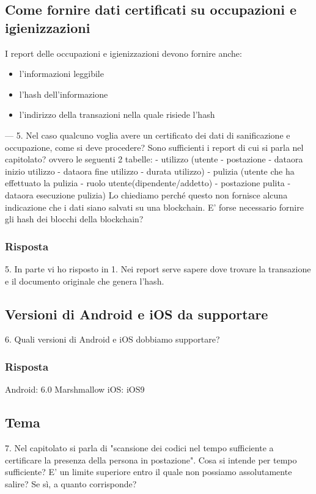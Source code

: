 \subsection*{Come fornire dati certificati su occupazioni e igienizzazioni}
I report delle occupazioni e igienizzazioni devono fornire anche:
\begin{itemize}
	\item l'informazioni leggibile
	\item l'hash dell'informazione
	\item l'indirizzo della transazioni nella quale risiede l'hash
\end{itemize}
---
5. Nel caso qualcuno voglia avere un certificato dei dati di sanificazione e occupazione, come si deve procedere? Sono sufficienti i report di cui si parla nel capitolato? ovvero le seguenti 2 tabelle:
- utilizzo (utente - postazione - dataora inizio utilizzo - dataora fine utilizzo - durata utilizzo)
- pulizia (utente che ha effettuato la pulizia - ruolo utente(dipendente/addetto) - postazione pulita - dataora esecuzione pulizia)
Lo chiediamo perché questo non fornisce alcuna indicazione che i dati siano salvati su una blockchain. E' forse necessario fornire gli hash dei blocchi della blockchain?
\subsubsection*{Risposta}
5. In parte vi ho risposto in 1. Nei report serve sapere dove trovare la transazione e il documento originale che genera l'hash.

\subsection*{Versioni di Android e iOS da supportare}
6. Quali versioni di Android e iOS dobbiamo supportare?
\subsubsection*{Risposta}
Android: 6.0 Marshmallow
iOS: iOS9


\subsection*{Tema}
7. Nel capitolato si parla di "scansione dei codici nel tempo sufficiente a certificare la presenza della persona in postazione". Cosa si intende per tempo sufficiente? E' un limite superiore entro il quale non possiamo assolutamente salire? Se sì, a quanto corrisponde?
